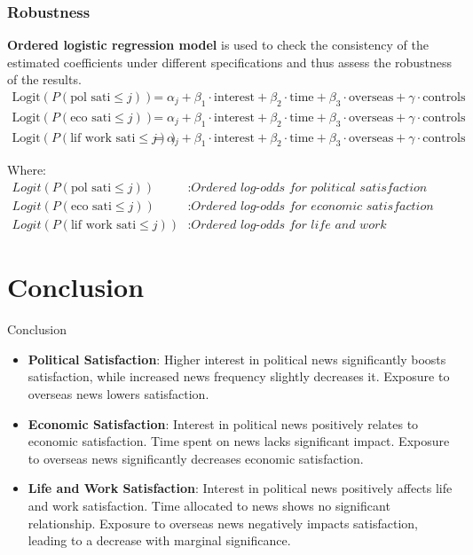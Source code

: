 \documentclass{beamer}
\begin{document}
\begin{frame}
\frametitle{Robustness}
\textbf{Ordered logistic regression model} is used to check the consistency of the estimated coefficients under different specifications and thus assess the robustness of the results.
\vspace{12pt}
\scriptsize
\begin{align}
\text{Logit}(P(\text{pol sati} \leq j)) &= \alpha_j + \beta_1 \cdot \text{interest} + \beta_2 \cdot \text{time} + \beta_3 \cdot \text{overseas} + \gamma \cdot \text{controls} \\
\text{Logit}(P(\text{eco sati} \leq j)) &= \alpha_j + \beta_1 \cdot \text{interest} + \beta_2 \cdot \text{time} + \beta_3 \cdot \text{overseas} + \gamma \cdot \text{controls} \\
\text{Logit}(P(\text{lif work sati} \leq j)) &= \alpha_j + \beta_1 \cdot \text{interest} + \beta_2 \cdot \text{time} + \beta_3 \cdot \text{overseas} + \gamma \cdot \text{controls}
\end{align}

Where:
\begin{align*}
\textit{Logit}(P(\text{pol sati} \leq j)) &: \textit{Ordered log-odds for political satisfaction} \\
\textit{Logit}(P(\text{eco sati} \leq j)) &: \textit{Ordered log-odds for economic satisfaction} \\
\textit{Logit}(P(\text{lif work sati} \leq j)) &: \textit{Ordered log-odds for life and work satisfaction}
\end{align*}
\end{frame}


\section{Conclusion}
\begin{frame}{Conclusion}
\begin{itemize}
     \item \textbf{Political Satisfaction}: Higher interest in political news significantly boosts satisfaction, while increased news frequency slightly decreases it. Exposure to overseas news lowers satisfaction.
     \item \textbf{Economic Satisfaction}: Interest in political news positively relates to economic satisfaction. Time spent on news lacks significant impact. Exposure to overseas news significantly decreases economic satisfaction.
     \item \textbf{Life and Work Satisfaction}: Interest in political news positively affects life and work satisfaction. Time allocated to news shows no significant relationship. Exposure to overseas news negatively impacts satisfaction, leading to a decrease with marginal significance.
\end{itemize}
\end{frame}


\end{document}
